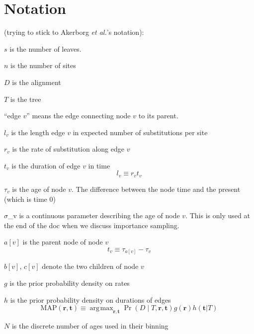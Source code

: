 \documentclass{llncs}
\newcommand{\etal}[0]{{\em et al.}\xspace}
\newcommand{\numLeaves}[0]{\ensuremath{s}\xspace}
\newcommand{\numSites}[0]{\ensuremath{n}\xspace}
\newcommand{\dataMatrix}[0]{\ensuremath{D}\xspace}
\newcommand{\tree}[0]{\ensuremath{T}\xspace}
\newcommand{\edgeLen}[1]{\ensuremath{l_{#1}}\xspace}
\newcommand{\rate}[1]{\ensuremath{r_{#1}}\xspace}
\newcommand{\ratevec}[0]{\ensuremath{\mathbf{r}}\xspace}
\newcommand{\timevec}[0]{\ensuremath{\mathbf{t}}\xspace}
\newcommand{\contTime}[1]{\ensuremath{\sigma}_{#1}\xspace}
\newcommand{\duration}[1]{\ensuremath{t_{#1}}\xspace}
\newcommand{\age}[1]{\ensuremath{\tau_{#1}}\xspace}
\newcommand{\parent}[1]{\ensuremath{a[{#1}]}\xspace}
\newcommand{\firstChild}[1]{\ensuremath{b[{#1}]}\xspace}
\newcommand{\secondChild}[1]{\ensuremath{c[{#1}]}\xspace}
\newcommand{\ratePriorDensity}[0]{\ensuremath{g}\xspace}
\newcommand{\timePriorDensity}[0]{\ensuremath{h}\xspace}
\newcommand{\numAges}[0]{\ensuremath{N}\xspace}
\DeclareMathOperator*{\argmax}{\arg\!\max}
\begin{document}
\section{Notation}
(trying to stick to Akerborg \etal's notation):
\begin{compactitem}
    \item[\numLeaves] is the number of leaves.
    \item[\numSites] is the number of sites
    \item[\dataMatrix] is the alignment
    \item[\tree] is the tree
    \item[``edge $v$''] means the edge connecting node $v$ to its parent.
    \item[\edgeLen{v}] is the length edge $v$ in expected number of substitutions per site
    \item[\rate{v}] is the rate of substitution along edge $v$
    \item[\duration{v}] is the duration of edge $v$ in time
\begin{equation}
    \edgeLen{v} \equiv \rate{v}\duration{v}
\end{equation}
    \item[\age{v}] is the age of node $v$. The difference between the node time and the present (which is time 0)
    \item[\contTime{v}] is a continuous parameter describing the age of node $v$. This is only used at the end of the doc when we discuss importance sampling.
    \item[\parent{v}] is the parent node of node $v$
\begin{equation}
    \duration{v} \equiv \age{\parent{v}} - \age{v}
\end{equation}
    \item[\firstChild{v}, \secondChild{v}] denote the two children of node $v$
    \item[\ratePriorDensity] is the prior probability density on rates
    \item[\timePriorDensity] is the prior probability density on durations of edges
\begin{equation}
    \mbox{MAP}(\ratevec, \timevec)  \equiv \argmax_{\ratevec, \timevec} \Pr\left(\dataMatrix \mid \tree, \ratevec, \timevec\right) \ratePriorDensity(\ratevec) \timePriorDensity(\timevec | T)
\end{equation}
    \item[\numAges] is the discrete number of ages used in their binning
\end{compactitem}
\end{document}
